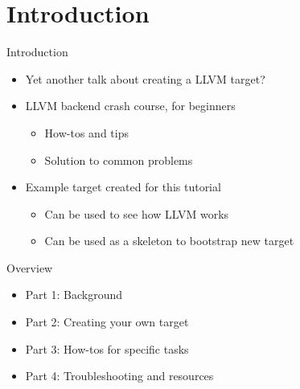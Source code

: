 \documentclass[t]{beamer}
\begin{document}
\section{Introduction}

\begin{frame}{Introduction}

\begin{itemize}
    \item Yet another talk about creating a LLVM target?
    \item LLVM backend crash course, for beginners
    \begin{itemize}
        \item How-tos and tips
        \item Solution to common problems
    \end{itemize}  
    \item Example target created for this tutorial
    \begin{itemize}
        \item Can be used to see how LLVM works
        \item Can be used as a skeleton to bootstrap new target
    \end{itemize}
\end{itemize}

\end{frame}


\begin{frame}{Overview}

\begin{itemize}
    \item Part 1: Background
    \item Part 2: Creating your own target
    \item Part 3: How-tos for specific tasks
    \item Part 4: Troubleshooting and resources
\end{itemize}

\end{frame}







\end{document}

